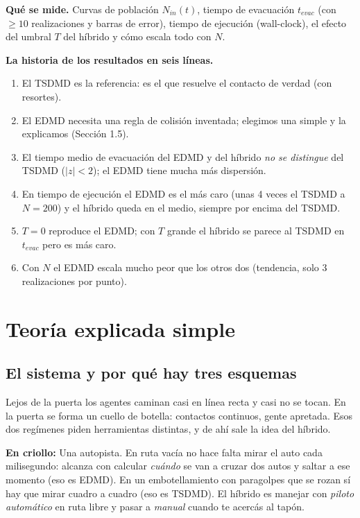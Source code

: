 \documentclass[10.5pt,a4paper]{article}
\newcommand{\analogia}[1]{\par\colorbox{ana}{\parbox{\dimexpr\linewidth-2\fboxsep}{\textbf{En criollo:} #1}}\par}
\begin{document}
\textbf{Qué se mide.} Curvas de población $N_{in}(t)$, tiempo de evacuación $t_{evac}$ (con $\geq10$ realizaciones y barras de error), tiempo de ejecución (wall-clock), el efecto del umbral $T$ del híbrido y cómo escala todo con $N$.

\textbf{La historia de los resultados en seis líneas.}
\begin{enumerate}
\item El TSDMD es la referencia: es el que resuelve el contacto de verdad (con resortes).
\item El EDMD necesita una regla de colisión inventada; elegimos una simple y la explicamos (Sección 1.5).
\item El tiempo medio de evacuación del EDMD y del híbrido \emph{no se distingue} del TSDMD ($|z|<2$); el EDMD tiene mucha más dispersión.
\item En tiempo de ejecución el EDMD es el más caro (unas 4 veces el TSDMD a $N=200$) y el híbrido queda en el medio, siempre por encima del TSDMD.
\item $T=0$ reproduce el EDMD; con $T$ grande el híbrido se parece al TSDMD en $t_{evac}$ pero es más caro.
\item Con $N$ el EDMD escala mucho peor que los otros dos (tendencia, solo 3 realizaciones por punto).
\end{enumerate}

\section{Teoría explicada simple}

\subsection{El sistema y por qué hay tres esquemas}
Lejos de la puerta los agentes caminan casi en línea recta y casi no se tocan. En la puerta se forma un cuello de botella: contactos continuos, gente apretada. Esos dos regímenes piden herramientas distintas, y de ahí sale la idea del híbrido.

\analogia{Una autopista. En ruta vacía no hace falta mirar el auto cada milisegundo: alcanza con calcular \emph{cuándo} se van a cruzar dos autos y saltar a ese momento (eso es EDMD). En un embotellamiento con paragolpes que se rozan sí hay que mirar cuadro a cuadro (eso es TSDMD). El híbrido es manejar con \emph{piloto automático} en ruta libre y pasar a \emph{manual} cuando te acercás al tapón.}
\end{document}
